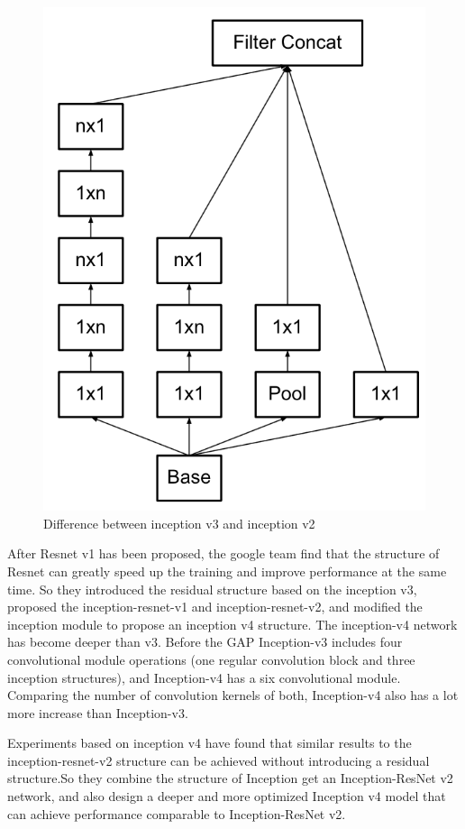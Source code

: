 \documentclass[10pt,twocolumn,letterpaper]{article}
\begin{document}
\begin{figure}[t]
	\begin{center}
		\includegraphics[width=0.8\linewidth]{Pic/17.jpg}
	\end{center}
	\caption{Difference between inception v3 and inception v2} \label{fig:long}
	\label{fig:onecol}
\end{figure}

After Resnet v1 has been proposed, the google team find that the structure of Resnet can greatly speed up the training and improve performance at the same time. So they introduced the residual structure based on the inception v3, proposed the inception-resnet-v1 and inception-resnet-v2, and modified the inception module to propose an inception v4 structure\cite{szegedy2016inception-v4}. The inception-v4 network has become deeper than v3. Before the GAP Inception-v3 includes four convolutional module operations (one regular convolution block and three inception structures), and Inception-v4 has a six convolutional module. Comparing the number of convolution kernels of both, Inception-v4 also has a lot more increase than Inception-v3.

Experiments based on inception v4 have found that similar results to the inception-resnet-v2 structure can be achieved without introducing a residual structure.So they combine the structure of Inception  get an Inception-ResNet v2 network, and also design a deeper and more optimized Inception v4 model that can achieve performance comparable to Inception-ResNet v2.
\end{document}
